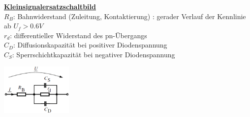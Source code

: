         

  \begin{minipage}[T]{15.5cm}
    \underline{\bf Kleinsignalersatzschaltbild}\\
    $R_B$: Bahnwiderstand (Zuleitung, Kontaktierung) : gerader Verlauf der Kennlinie ab $U_f >0.6V$\\
    $r_d$: differentieller Widerstand des pn-\"Ubergangs\\
    $C_D$: Diffusionskapazit\"at bei positiver Diodenspannung\\
    $C_S$: Sperrschichtkapazit\"at bei negativer Diodenspannung\\
  \end{minipage}
  \begin{minipage}{3.5cm}
    \includegraphics[width=3.5cm]{./bilder/DiodeKleinsigErs}\\
  \end{minipage}\\
  
